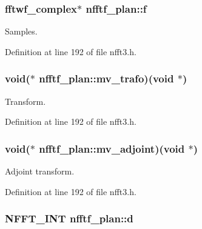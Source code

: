\hypertarget{structnfftf__plan_a1c2e419705d6254801134bffe0695ae1}{
\subsubsection[{f}]{\setlength{\rightskip}{0pt plus 5cm}fftwf\-\_\-complex$\ast$ nfftf\-\_\-plan\-::f}}\label{structnfftf__plan_a1c2e419705d6254801134bffe0695ae1}


Samples. 



Definition at line 192 of file nfft3.\-h.

\hypertarget{structnfftf__plan_ab09b1d93f60895791076e1e41241ecb0}{
\subsubsection[{mv\-\_\-trafo}]{\setlength{\rightskip}{0pt plus 5cm}void($\ast$ nfftf\-\_\-plan\-::mv\-\_\-trafo)(void $\ast$)}}\label{structnfftf__plan_ab09b1d93f60895791076e1e41241ecb0}


Transform. 



Definition at line 192 of file nfft3.\-h.

\hypertarget{structnfftf__plan_a9f8b111e42ef7ba609879d4a6983695d}{
\subsubsection[{mv\-\_\-adjoint}]{\setlength{\rightskip}{0pt plus 5cm}void($\ast$ nfftf\-\_\-plan\-::mv\-\_\-adjoint)(void $\ast$)}}\label{structnfftf__plan_a9f8b111e42ef7ba609879d4a6983695d}


Adjoint transform. 



Definition at line 192 of file nfft3.\-h.

\hypertarget{structnfftf__plan_a7408c047e046ca38493625bb60513849}{
\subsubsection[{d}]{\setlength{\rightskip}{0pt plus 5cm}N\-F\-F\-T\-\_\-\-I\-N\-T nfftf\-\_\-plan\-::d}}\label{structnfftf__plan_a7408c047e046ca38493625bb60513849}


